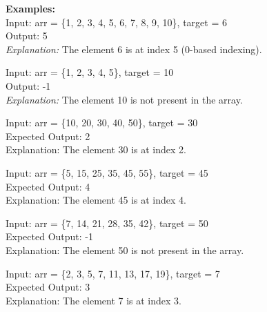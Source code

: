 \documentclass[12pt]{article}
\begin{document}
\begin{enumerate}
    \textbf{Examples:} \\
    Input: arr = \{1, 2, 3, 4, 5, 6, 7, 8, 9, 10\}, target = 6 \\
    Output: 5 \\
    \textit{Explanation:} The element 6 is at index 5 (0-based indexing).
    
    Input: arr = \{1, 2, 3, 4, 5\}, target = 10 \\
    Output: -1 \\
    \textit{Explanation:} The element 10 is not present in the array.
    
    Input: arr = \{10, 20, 30, 40, 50\}, target = 30 \\
    Expected Output: 2 \\
    Explanation: The element 30 is at index 2.
    
    Input: arr = \{5, 15, 25, 35, 45, 55\}, target = 45 \\
    Expected Output: 4 \\
    Explanation: The element 45 is at index 4.
    
    Input: arr = \{7, 14, 21, 28, 35, 42\}, target = 50 \\
    Expected Output: -1 \\
    Explanation: The element 50 is not present in the array.
    
    Input: arr = \{2, 3, 5, 7, 11, 13, 17, 19\}, target = 7 \\
    Expected Output: 3 \\
    Explanation: The element 7 is at index 3.
    
\end{enumerate}
\end{document}
